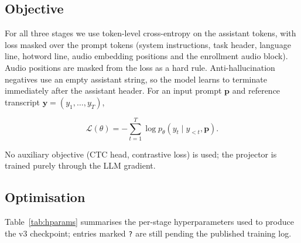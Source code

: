 \subsection{Objective}

For all three stages we use token-level cross-entropy on the assistant
tokens, with loss masked over the prompt tokens (system instructions,
task header, language line, hotword line, audio embedding positions
and the enrollment audio block). Audio positions are masked from the
loss as a hard rule. Anti-hallucination negatives use an empty
assistant string, so the model learns to terminate immediately after
the assistant header. For an input prompt $\mathbf{p}$ and reference
transcript $\mathbf{y} = (y_1, \ldots, y_T)$,

\begin{equation}
  \mathcal{L}(\theta) = -\sum_{t=1}^{T} \log p_\theta(y_t \mid y_{<t}, \mathbf{p}).
  \label{eq:sft-loss}
\end{equation}

No auxiliary objective (CTC head, contrastive loss) is used; the
projector is trained purely through the LLM gradient.

\subsection{Optimisation}

Table~\ref{tab:hparams} summarises the per-stage hyperparameters used
to produce the v3 checkpoint; entries marked \texttt{?} are still
pending the published training log.

